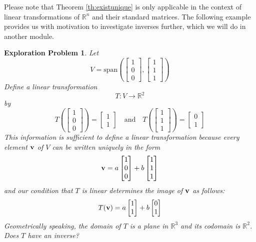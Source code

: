 \documentclass{ximera}
\renewcommand{\vec}[1]{{\bf #1}}
\newcommand{\RR}{\mathbb{R}}
\newtheorem{initprob}{Exploration Problem}
\begin{document}


Please note that Theorem \ref{th:existunique} is only applicable in the context of linear transformations of $\RR^n$ and their standard matrices.  The following example provides us with motivation to investigate inverses further, which we will do in another module.

\begin{initprob}\label{init:subtosub}
Let $$V=\text{span}\left(\begin{bmatrix}1\\0\\0\end{bmatrix}, \begin{bmatrix}1\\1\\1\end{bmatrix}\right)$$
Define a linear transformation $$T:V\rightarrow \RR^2$$
by $$T\left(\begin{bmatrix}1\\0\\0\end{bmatrix}\right)=\begin{bmatrix}1\\1\end{bmatrix}\quad \text{and} \quad T\left(\begin{bmatrix}1\\1\\1\end{bmatrix}\right)=\begin{bmatrix}0\\1\end{bmatrix}$$
This information is sufficient to define a linear transformation because every element $\vec{v}$ of $V$ can be written uniquely in the form $$\vec{v}=a\begin{bmatrix}1\\0\\0\end{bmatrix}+b\begin{bmatrix}1\\1\\1\end{bmatrix}$$  
and our condition that $T$ is linear determines the image of $\vec{v}$ as follows: $$T(\vec{v})=a\begin{bmatrix}1\\1\end{bmatrix}+b\begin{bmatrix}0\\1\end{bmatrix}$$
Geometrically speaking, the domain of $T$ is a plane in $\RR^3$ and its codomain is $\RR^2$.  Does $T$ have an inverse?  


\end{initprob}
\end{document}
